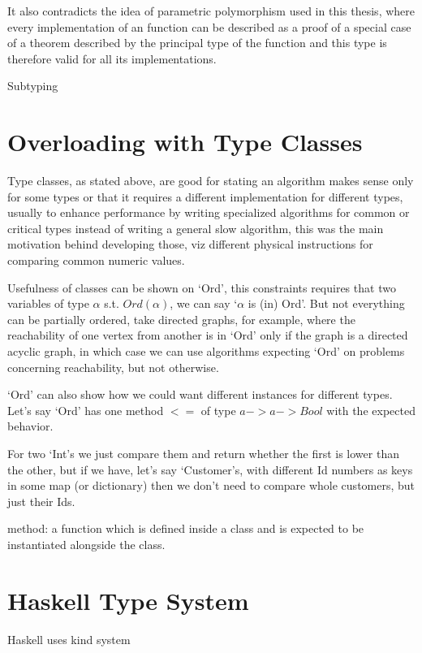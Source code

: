 It also contradicts the idea of parametric polymorphism used in this thesis, where every implementation of an function can be
described as a proof of a special case of a theorem described by the principal type of the function and this type is therefore
valid for all its implementations.

Subtyping %

\section{Overloading with Type Classes}

Type classes, as stated above, are good for stating an algorithm makes sense only for some types or that it requires a different implementation for different types, usually to enhance performance by writing specialized algorithms for common or critical types instead of writing a general slow algorithm,
this was the main motivation behind developing those, %
viz different physical instructions for comparing common numeric values.

Usefulness of classes can be shown on `Ord', this constraints requires that two variables of type $\alpha$ s.t. $Ord(\alpha)$, we can say `$\alpha$ is (in) Ord'.
But not everything can be partially ordered, take directed graphs, for example, where the reachability of one vertex from another is in `Ord' only if the graph is a directed acyclic graph, in which case we can use algorithms expecting `Ord' on problems concerning reachability, but not otherwise.

`Ord' can also show how we could want different instances for different types. Let's say `Ord' has one method $<=$ of type $a -> a -> Bool$ with the expected behavior. %

For two `Int's we just compare them and return whether the first is lower than the other,
but if we have, let's say `Customer's, with different Id numbers as keys in some map (or dictionary) then we don't need to compare whole customers,
but just their Ids.

method: a function which is defined inside a class and is expected to be instantiated alongside the class. %



\section{Haskell Type System}

Haskell uses kind system %

